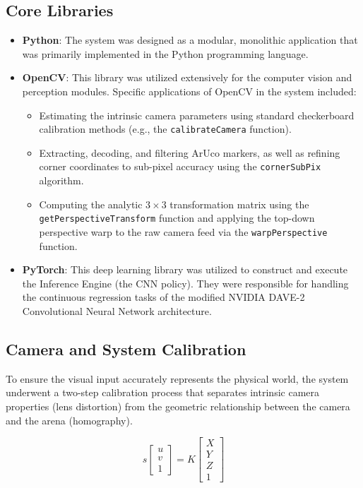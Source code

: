 \subsection{Core Libraries}

\begin{itemize}
    \item \textbf{Python}: The system was designed as a modular, monolithic application that was primarily implemented in the Python programming language.
    \item \textbf{OpenCV}: This library was utilized extensively for the computer vision and perception modules. Specific applications of OpenCV in the system included:
    \begin{itemize}
        \item Estimating the intrinsic camera parameters using standard checkerboard calibration methods (e.g., the \texttt{calibrateCamera} function).
        \item Extracting, decoding, and filtering ArUco markers, as well as refining corner coordinates to sub-pixel accuracy using the \texttt{cornerSubPix} algorithm.
        \item Computing the analytic $3 \times 3$ transformation matrix using the \texttt{getPerspectiveTransform} function and applying the top-down perspective warp to the raw camera feed via the \texttt{warpPerspective} function.
    \end{itemize}
    \item \textbf{PyTorch}: This deep learning library was utilized to construct and execute the Inference Engine (the CNN policy). They were responsible for handling the continuous regression tasks of the modified NVIDIA DAVE-2 Convolutional Neural Network architecture.
\end{itemize}

\subsection{Camera and System Calibration}
To ensure the visual input accurately represents the physical world, the system underwent
a two-step calibration process that separates intrinsic camera properties (lens distortion)
from the geometric relationship between the camera and the arena (homography).

\begin{equation}
    s \begin{bmatrix} u \\ v \\ 1 \end{bmatrix} = K \begin{bmatrix} X \\ Y \\ Z \\ 1 \end{bmatrix}
\end{equation}


